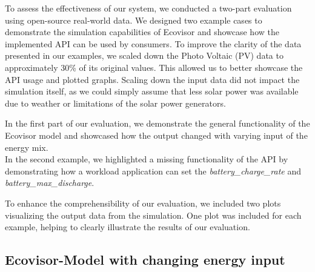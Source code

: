 To assess the effectiveness of our system, we conducted a two-part evaluation using open-source real-world data. We designed two example cases to demonstrate the simulation capabilities of Ecovisor and showcase how the implemented API can be used by consumers. To improve the clarity of the data presented in our examples, we scaled down the Photo Voltaic (PV) data to approximately 30\% of its original values. This allowed us to better showcase the API usage and plotted graphs. Scaling down the input data did not impact the simulation itself, as we could simply assume that less solar power was available due to weather or limitations of the solar power generators.

In the first part of our evaluation, we demonstrate the general functionality of the Ecovisor model and showcased how the output changed with varying input of the energy mix.\\
 In the second example, we highlighted a missing functionality of the API by demonstrating how a workload application can set the \textit{battery\_charge\_rate} and \textit{battery\_max\_discharge}.
 
To enhance the comprehensibility of our evaluation, we included two plots visualizing the output data from the simulation. One plot was included for each example, helping to clearly illustrate the results of our evaluation.


\subsection{Ecovisor-Model with changing energy input}

